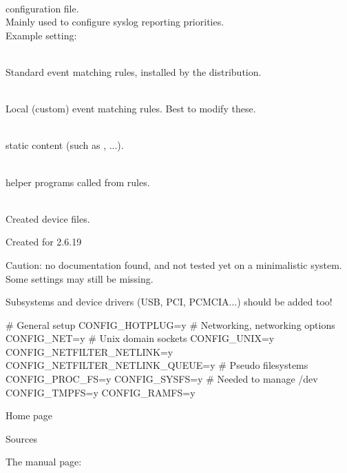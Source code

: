   \startitemize
  \item {}\\
     configuration file.\\
    Mainly used to configure syslog reporting priorities.\\
    Example setting: 
  \item {}\\
    Standard  event matching rules, installed by the distribution.
  \item {}\\
    Local (custom)  event matching rules. Best to modify these.
  \item {}\\
    static  content (such as ,
    ...).
  \item {}\\
    helper programs called from  rules.
  \item {}\\
    Created device files.
  \stopitemize

  \startitemize
  \item Created for 2.6.19
  \item Caution: no documentation found, and not tested yet on a minimalistic system. Some settings may still be missing.
  \item Subsystems and device drivers (USB, PCI, PCMCIA...) should be added too!
  \stopitemize
  \begin{block}{}
\tiny
\starttyping
# General setup
CONFIG_HOTPLUG=y
# Networking, networking options
CONFIG_NET=y
# Unix domain sockets
CONFIG_UNIX=y
CONFIG_NETFILTER_NETLINK=y
CONFIG_NETFILTER_NETLINK_QUEUE=y
# Pseudo filesystems
CONFIG_PROC_FS=y
CONFIG_SYSFS=y
# Needed to manage /dev
CONFIG_TMPFS=y
CONFIG_RAMFS=y
\stoptyping
  \end{block}


  \startitemize
  \item Home page\\
  \item Sources\\
  \item The  manual page:\\
  \stopitemize


